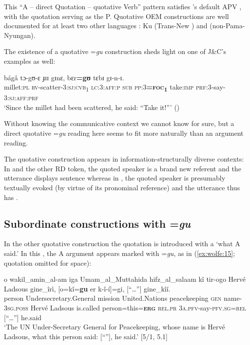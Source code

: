 \documentclass[output=paper,modfonts]{langscibook}
\begin{document}
This “A – direct Quotation – quotative Verb” pattern satisfies ’s default APV , with the quotation serving as the P. Quotative OEM constructions are well documented for at least two other languages \citep{Rumsey2010}: Ku  (Trans-New ) and  (non-Pama-Nyungan). 

The existence of a quotative =\textit{gu} construction sheds light on one of J\&C’s examples as well:

\ea\label{ex:wolfe:14}
\gll bágâ tɔ-gʊ-ɛ ɟɪɪ gɪnɛ, bɛr\textbf{=gʊ} tɛbɪ gɪ-n-ɪ.\\
     millet:\textsc{pl} \textsc{rv}-scatter-3:\textsc{sj}:\textsc{cvb}\textsc{\textsubscript{1}} \textsc{lc}:3:\textsc{aff}:\textsc{p} \textsc{sub} \textsc{pp}:3\textbf{=}\textsc{\textbf{foc}}\textsc{\textbf{\textsubscript{1}}} take:\textsc{imp} \textsc{prf}:3-say-3:\textsc{sj}:\textsc{aff}:\textsc{prf}\\
\glt ‘Since the millet had been scattered, he said: “Take it!”’ (\citealt[152]{JakobiCrass2004})
\z

Without knowing the communicative context we cannot know for sure, but a direct quotative =\textit{gu} reading here seems to fit more naturally than an argument  reading.

The quotative construction appears in information-structurally diverse contexts: In  and the other RD token, the quoted speaker is a brand new referent and the utterance displays sentence  whereas in , the quoted speaker is presumably textually evoked (by virtue of its pronominal reference) and the utterance thus has  .

\subsection{Subordinate constructions with =\textit{gu}}\label{sec:wolfe:3.5}
In the other quotative construction the quotation is introduced with a  ‘what A said.’ In this , the A argument appears marked with =\textit{gu}, as in (\ref{ex:wolfe:15}; quotation omitted for space):

\ea\label{ex:wolfe:15}
\gll o      wakil\_amin\_al-am       iga 	   Umam\_al\_Muttahida  hifz\_al\_salaam kî tir-ogo                    Hervé Ladsous gine\_îrì, [o=kî=\textbf{gu} er\textbf{} k-î-í]=gi, [“…”] gine\_kîí.\\
     person Undersecretary.General mission United.Nations     peacekeeping   \textsc{gen} name-\textsc{3sg}.\textsc{poss} Hervé Ladsous is.called person=this=\textsc{\textbf{erg}} \textsc{rel}.\textsc{pr} \textsc{3}\textsc{a}.\textsc{pfv}-say-\textsc{pfv}.\textsc{sg}=\textsc{rel} [“…”] he.said\\
\glt ‘The UN Under-Secretary General for Peacekeeping, whose name is Hervé Ladsous, what this person said: [“”], he said.’ [5/1, 5.1]
\z
\end{document}
